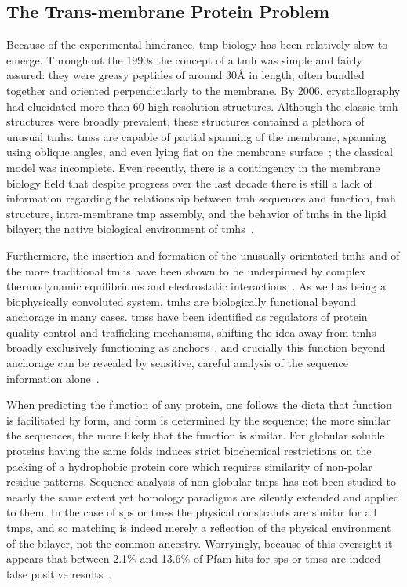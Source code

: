 \subsection{The Trans-membrane Protein Problem}

Because of the experimental hindrance, \gls{tmp} biology has been relatively slow to emerge. Throughout the 1990s the concept of a \gls{tmh} was simple and fairly assured: they were greasy peptides of around 30{\AA} in length, often bundled together and oriented perpendicularly to the membrane. By 2006, crystallography had elucidated more than 60 high resolution structures. Although the classic \gls{tmh} structures were broadly prevalent, these structures contained a plethora of unusual \gls{tmh}s. \gls{tms}s are capable of partial spanning of the membrane, spanning using oblique angles, and even lying flat on the membrane surface~\cite{VonHeijne2006, Elofsson2007}; the classical model was incomplete. Even recently, there is a contingency in the  membrane biology field that despite progress over the last decade there is still a lack of information regarding the relationship between \gls{tmh} sequences and function, \gls{tmh} structure, intra-membrane \gls{tmp} assembly, and the behavior of \gls{tmh}s in the lipid bilayer; the native biological environment of \gls{tmh}s~\cite{Ladokhin2015}.

Furthermore, the insertion and formation of the unusually orientated \gls{tmh}s and of the more traditional \gls{tmh}s have been shown to be underpinned by complex thermodynamic equilibriums and electrostatic interactions~\cite{Cymer2014, Elisa2012, Ismail2015}. As well as being a biophysically convoluted system, \gls{tmh}s are biologically functional beyond anchorage in many cases. \gls{tms}s have been identified as regulators of protein quality control and trafficking mechanisms, shifting the idea away from \gls{tmh}s broadly exclusively functioning as anchors~\cite{Hessa2011}, and crucially this function beyond anchorage can be revealed by sensitive, careful analysis of the sequence information alone~\cite{Wong2012}.

When predicting the function of any protein, one follows the dicta that function is facilitated by form, and form is determined by the sequence; the more similar the sequences, the more likely that the function is similar. For globular soluble proteins having the same folds induces strict biochemical restrictions on the packing of a hydrophobic protein core which requires similarity of non-polar residue patterns. Sequence analysis of non-globular \gls{tmp}s has not been studied to nearly the same extent yet homology paradigms are silently extended and applied to them. In the case of \gls{sp}s or \gls{tms}s the physical constraints are similar for all \gls{tmp}s, and so matching is indeed merely a reflection of the physical environment of the bilayer, not the common ancestry. Worryingly, because of this oversight it appears that between 2.1\% and 13.6\% of Pfam hits for \gls{sp}s or \gls{tms}s are indeed false positive results~\cite{Wong2010}.



